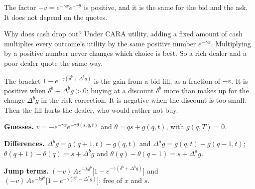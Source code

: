 The factor $-v=e^{-\gamma x}e^{-\gamma\theta}$ is positive, and it is the same for the bid and the ask. It does not depend on the quotes.

\begin{intuition}
Why does cash drop out? Under CARA utility, adding a fixed amount of cash multiplies every outcome's utility by the same positive number $e^{-\gamma x}$. Multiplying by a positive number never changes which choice is best. So a rich dealer and a poor dealer quote the same way.
\end{intuition}

\begin{example}
The bracket $1-e^{-\gamma(\delta^b+\Delta^bg)}$ is the gain from a bid fill, as a fraction of $-v$. It is positive when $\delta^b+\Delta^bg>0$: buying at a discount $\delta^b$ more than makes up for the change $\Delta^bg$ in the risk correction. It is negative when the discount is too small. Then the fill hurts the dealer, who would rather not buy.
\end{example}

\begin{recall}
\textbf{Guesses.} $v=-e^{-\gamma x}e^{-\gamma\theta(s,q,t)}$ and $\theta=qs+g(q,t)$, with $g(q,T)=0$.

\textbf{Differences.} $\Delta^bg=g(q+1,t)-g(q,t)$ and $\Delta^ag=g(q,t)-g(q-1,t)$; $\theta(q+1)-\theta(q)=s+\Delta^bg$ and $\theta(q)-\theta(q-1)=s+\Delta^ag$.

\textbf{Jump terms.} $(-v)\,Ae^{-k\delta^b}\big[1-e^{-\gamma(\delta^b+\Delta^bg)}\big]$ and $(-v)\,Ae^{-k\delta^a}\big[1-e^{-\gamma(\delta^a-\Delta^ag)}\big]$: free of $x$ and $s$.
\end{recall}
